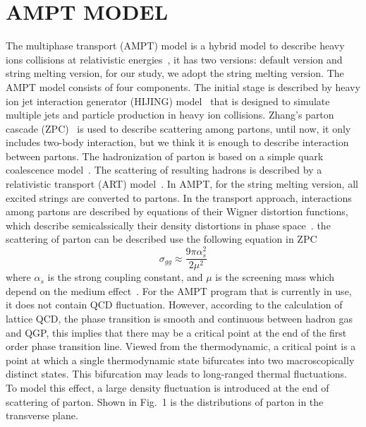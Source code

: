 \documentclass[11pt,a4paper,openany]{article}
\begin{document}
\section{AMPT MODEL}
The multiphase transport (AMPT) model is a hybrid model to describe heavy ions collisions at
relativistic energies~\cite{AMPT-MODEL}, it has two versions: default version and string melting
version, for our study, we adopt the string melting version. The AMPT model consists of four
components. The initial stage is described by heavy ion jet interaction generator (HIJING)
model~\cite{HIJING} that is designed to simulate multiple jets and particle production in heavy ion
collisions. Zhang's parton cascade (ZPC)~\cite{ZPC} is used to describe scattering among partons,
until now, it only includes two-body interaction, but we think it is enough to describe interaction
between partons. The hadronization of parton is based on a simple quark coalescence
model~\cite{AMPT-MODEL}. The scattering of resulting hadrons is described by a relativistic
transport (ART) model~\cite{ART,ART2}. In AMPT, for the string melting version, all excited strings
are converted to partons. In the transport approach, interactions among partons are described by
equations of their Wigner distortion functions, which describe semicalssically their density
distortions in phase space~\cite{ZPC}. the scattering of parton can be described use the following equation in
ZPC
\begin{equation}
  \label{eq:1}
  \sigma_{gg} \approx \frac{9\pi\alpha_{s}^{2}}{2\mu^{2}}
\end{equation}
where $\alpha_{s}$ is the strong coupling constant, and $\mu$ is the screening mass which depend on
the medium effect~\cite{ZPC}. For the AMPT program that is currently in use, it does not contain QCD
fluctuation. However, according to the calculation of lattice QCD, the phase transition is smooth
and continuous between hadron gas and QGP, this implies that there may be a critical point at the
end of the first order phase transition line. Viewed from the thermodynamic, a critical point is a
point at which a single thermodynamic state bifurcates into two macroscopically distinct states.
This bifurcation may leads to long-ranged thermal fluctuations. To model this effect, a large
density fluctuation is introduced at the end of scattering of parton. Shown in Fig.~1 is the
distributions of parton in the transverse plane.
\end{document}
